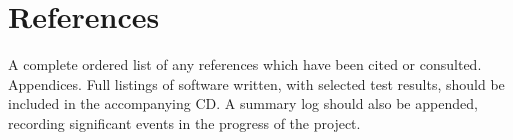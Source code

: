 \documentclass{l4proj}
\begin{document}
\chapter{References}
 A complete ordered list of any references which have been cited or consulted.
Appendices. Full listings of software written, with selected test results, should be included in the accompanying CD. A summary log should also be appended, recording significant events in the progress of the project.

\printbibliography
\end{document}
